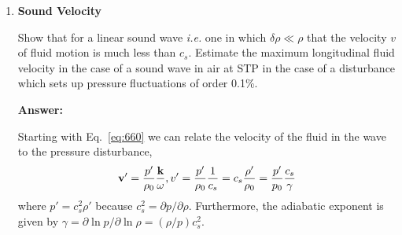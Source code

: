 \documentclass{article}
\begin{document}
\begin{enumerate}
\item{\bf Sound Velocity}

  Show that for a linear sound wave {\em i.e.} one in which $\delta
  \rho \ll \rho$ that the velocity $v$ of fluid motion is much less
  than $c_s$. Estimate the maximum longitudinal fluid velocity in the
  case of a sound wave in air at STP in the case of a disturbance
  which sets up pressure fluctuations of order 0.1\%.

{\bf Answer:}

Starting with Eq.~\ref{eq:660} we can relate the velocity of the fluid
in the wave to the pressure disturbance,
\begin{equation}
{\bf v}' = \frac{p'}{\rho_0} \frac{{\bf k} }{\omega}, v' =
\frac{p'}{\rho_0} \frac{1}{c_s} = c_s \frac{\rho'}{\rho_0} =
\frac{p'}{p_0} \frac{c_s}{\gamma}
\end{equation}
where $p' = c_s^2 \rho'$ because $c_s^2=\partial p/\partial \rho$.
Furthermore, the adiabatic exponent is given by $\gamma=\partial \ln
p/\partial \ln \rho=(\rho/p) c_s^2$.

\end{enumerate}

\ifx\bookloaded\undefined
\end{document}
